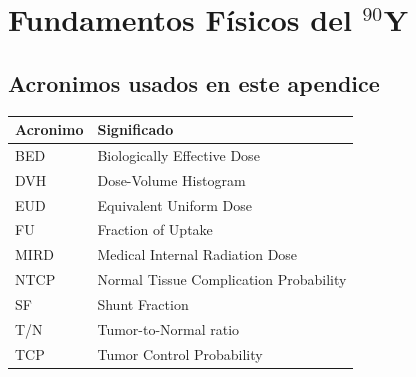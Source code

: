 \documentclass[12pt,a4paper]{article}
\begin{document}
\newpage

\appendix

\newpage

\appendix

\newpage

\appendix

\newpage

\appendix

\newpage

\appendix

\newpage

\appendix
\section{Fundamentos Físicos del \texorpdfstring{$^{90}$Y}{Y-90}}

\subsection*{Acronimos usados en este apendice}
\begin{tabular}{ll}
\toprule
\textbf{Acronimo} & \textbf{Significado} \\
\midrule
BED & Biologically Effective Dose \\
DVH & Dose-Volume Histogram \\
EUD & Equivalent Uniform Dose \\
FU & Fraction of Uptake \\
MIRD & Medical Internal Radiation Dose \\
NTCP & Normal Tissue Complication Probability \\
SF & Shunt Fraction \\
T/N & Tumor-to-Normal ratio \\
TCP & Tumor Control Probability \\
\bottomrule
\end{tabular}
\end{document}
